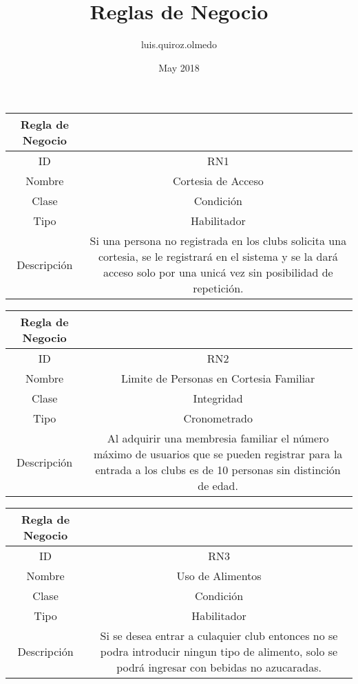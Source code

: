 \documentclass{article}
\title{Reglas de Negocio}
\author{luis.quiroz.olmedo }
\date{May 2018}
\begin{document}
\maketitle

\begin{center}
\begin{tabular}{ |c|c| } 
 \hline
 Regla de Negocio & \\
 \hline
 ID & RN1 \\ 
  \hline
  Nombre & Cortesia de Acceso\\ 
  \hline
  Clase & Condición\\ 
  \hline
  Tipo & Habilitador\\ 
  \hline
  Descripción & Si una persona no registrada en los clubs solicita una cortesia, se le registrará en  el sistema y se la dará acceso solo por una unicá vez sin posibilidad de repetición.\\ 
   \hline
 \hline
\end{tabular}
\end{center}
\begin{center}
\begin{tabular}{ |c|c| } 
 \hline
 Regla de Negocio & \\
 \hline
 ID & RN2 \\ 
  \hline
  Nombre & Limite de Personas en Cortesia Familiar\\ 
  \hline
  Clase & Integridad\\ 
  \hline
  Tipo & Cronometrado\\ 
  \hline
  Descripción & Al adquirir una membresia familiar el número máximo de usuarios que se pueden registrar para la entrada a los clubs es de 10 personas sin distinción de edad.\\ 
   \hline
 \hline
\end{tabular}
\end{center}

\begin{center}
\begin{tabular}{ |c|c| } 
 \hline
 Regla de Negocio & \\
 \hline
 ID & RN3 \\ 
  \hline
  Nombre & Uso de Alimentos\\ 
  \hline
  Clase & Condición\\ 
  \hline
  Tipo & Habilitador\\ 
  \hline
  Descripción & Si se desea entrar a culaquier club entonces no se podra introducir ningun tipo de alimento, solo se podrá ingresar con bebidas no azucaradas.\\ 
   \hline
 \hline
\end{tabular}
\end{center}
\end{document}
